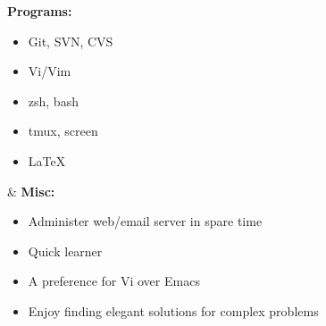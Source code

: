 \documentclass[]{res}
\begin{document}
\begin{resume}
\begin{ncolumn}{2}
  {\bf Programs:}
  \begin{itemize}
  \item Git, SVN, CVS
  \item Vi/Vim
  \item zsh, bash
  \item tmux, screen
  \item \LaTeX
  \end{itemize}
&
  {\bf Misc:}
  \begin{itemize}
  \item Administer web/email server in spare time
  \item Quick learner
  \item A preference for Vi over Emacs
  \item Enjoy finding elegant solutions for complex problems
  \end{itemize}
\end{ncolumn}


\end{resume}
\end{document}
